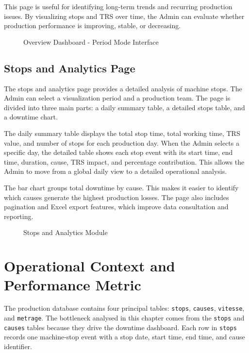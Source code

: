 This page is useful for identifying long-term trends and recurring production issues. By visualizing stops and TRS over time, the Admin can evaluate whether production performance is improving, stable, or decreasing.

\begin{figure}[H]
\centering
{}
\caption{Overview Dashboard - Period Mode Interface}
\label{fig:chapter3-2}
\end{figure}

\subsection{Stops and Analytics Page}

The stops and analytics page provides a detailed analysis of machine stops. The Admin can select a visualization period and a production team. The page is divided into three main parts: a daily summary table, a detailed stops table, and a downtime chart.

The daily summary table displays the total stop time, total working time, TRS value, and number of stops for each production day. When the Admin selects a specific day, the detailed table shows each stop event with its start time, end time, duration, cause, TRS impact, and percentage contribution. This allows the Admin to move from a global daily view to a detailed operational analysis.

The bar chart groups total downtime by cause. This makes it easier to identify which causes generate the highest production losses. The page also includes pagination and Excel export features, which improve data consultation and reporting.

\begin{figure}[H]
\centering
{}
\caption{Stops and Analytics Module}
\label{fig:chapter3-3}
\end{figure}

\section{Operational Context and Performance Metric}

The production database contains four principal tables: \texttt{stops}, \texttt{causes}, \texttt{vitesse}, and \texttt{metrage}. The bottleneck analysed in this chapter comes from the \texttt{stops} and \texttt{causes} tables because they drive the downtime dashboard. Each row in \texttt{stops} records one machine-stop event with a stop date, start time, end time, and cause identifier.

